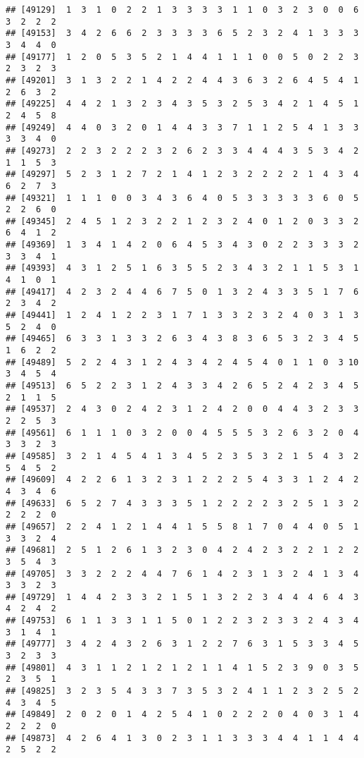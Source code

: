 \documentclass[
]{article}
\begin{document}
\begin{verbatim}
## [49129]  1  3  1  0  2  2  1  3  3  3  3  1  1  0  3  2  3  0  0  6  3  2  2  2
## [49153]  3  4  2  6  6  2  3  3  3  3  6  5  2  3  2  4  1  3  3  3  3  4  4  0
## [49177]  1  2  0  5  3  5  2  1  4  4  1  1  1  0  0  5  0  2  2  3  2  3  2  3
## [49201]  3  1  3  2  2  1  4  2  2  4  4  3  6  3  2  6  4  5  4  1  2  6  3  2
## [49225]  4  4  2  1  3  2  3  4  3  5  3  2  5  3  4  2  1  4  5  1  2  4  5  8
## [49249]  4  4  0  3  2  0  1  4  4  3  3  7  1  1  2  5  4  1  3  3  3  3  4  0
## [49273]  2  2  3  2  2  2  3  2  6  2  3  3  4  4  4  3  5  3  4  2  1  1  5  3
## [49297]  5  2  3  1  2  7  2  1  4  1  2  3  2  2  2  2  1  4  3  4  6  2  7  3
## [49321]  1  1  1  0  0  3  4  3  6  4  0  5  3  3  3  3  3  6  0  5  2  2  6  0
## [49345]  2  4  5  1  2  3  2  2  1  2  3  2  4  0  1  2  0  3  3  2  6  4  1  2
## [49369]  1  3  4  1  4  2  0  6  4  5  3  4  3  0  2  2  3  3  3  2  3  3  4  1
## [49393]  4  3  1  2  5  1  6  3  5  5  2  3  4  3  2  1  1  5  3  1  4  1  0  1
## [49417]  4  2  3  2  4  4  6  7  5  0  1  3  2  4  3  3  5  1  7  6  2  3  4  2
## [49441]  1  2  4  1  2  2  3  1  7  1  3  3  2  3  2  4  0  3  1  3  5  2  4  0
## [49465]  6  3  3  1  3  3  2  6  3  4  3  8  3  6  5  3  2  3  4  5  1  6  2  2
## [49489]  5  2  2  4  3  1  2  4  3  4  2  4  5  4  0  1  1  0  3 10  3  4  5  4
## [49513]  6  5  2  2  3  1  2  4  3  3  4  2  6  5  2  4  2  3  4  5  2  1  1  5
## [49537]  2  4  3  0  2  4  2  3  1  2  4  2  0  0  4  4  3  2  3  3  2  2  5  3
## [49561]  6  1  1  1  0  3  2  0  0  4  5  5  5  3  2  6  3  2  0  4  3  3  2  3
## [49585]  3  2  1  4  5  4  1  3  4  5  2  3  5  3  2  1  5  4  3  2  5  4  5  2
## [49609]  4  2  2  6  1  3  2  3  1  2  2  2  5  4  3  3  1  2  4  2  4  3  4  6
## [49633]  6  5  2  7  4  3  3  3  5  1  2  2  2  2  3  2  5  1  3  2  2  2  2  0
## [49657]  2  2  4  1  2  1  4  4  1  5  5  8  1  7  0  4  4  0  5  1  3  3  2  4
## [49681]  2  5  1  2  6  1  3  2  3  0  4  2  4  2  3  2  2  1  2  2  3  5  4  3
## [49705]  3  3  2  2  2  4  4  7  6  1  4  2  3  1  3  2  4  1  3  4  3  3  2  3
## [49729]  1  4  4  2  3  3  2  1  5  1  3  2  2  3  4  4  4  6  4  3  4  2  4  2
## [49753]  6  1  1  3  3  1  1  5  0  1  2  2  3  2  3  3  2  4  3  4  3  1  4  1
## [49777]  3  4  2  4  3  2  6  3  1  2  2  7  6  3  1  5  3  3  4  5  3  2  3  3
## [49801]  4  3  1  1  2  1  2  1  2  1  1  4  1  5  2  3  9  0  3  5  2  3  5  1
## [49825]  3  2  3  5  4  3  3  7  3  5  3  2  4  1  1  2  3  2  5  2  4  3  4  5
## [49849]  2  0  2  0  1  4  2  5  4  1  0  2  2  2  0  4  0  3  1  4  2  2  2  0
## [49873]  4  2  6  4  1  3  0  2  3  1  1  3  3  3  4  4  1  1  4  4  2  5  2  2

\end{verbatim}
\end{document}
